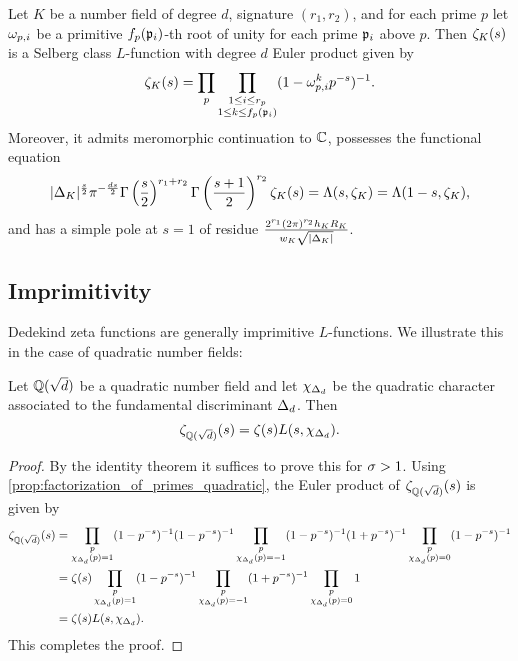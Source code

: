       \begin{theorem}\label{thm:Dedekind_Selberg}
        Let $K$ be a number field of degree $d$, signature $(r_{1},r_{2})$, and for each prime $p$ let $\omega_{p,i}$ be a primitive $f_{p}(\mathfrak{p}_{i})$-th root of unity for each prime $\mathfrak{p}_{i}$ above $p$. Then $\zeta_{K}(s)$ is a Selberg class $L$-function with degree $d$ Euler product given by
        \[
          \zeta_{K}(s) = \prod_{p}\prod_{\substack{1 \le i \le r_{p} \\ 1 \le k \le f_{p}(\mathfrak{p}_{i})}}(1-\omega_{p,i}^{k}p^{-s})^{-1}.
        \]
        Moreover, it admits meromorphic continuation to $\mathbb{C}$, possesses the functional equation
        \[
          |\Delta_{K}|^{\frac{s}{2}}\pi^{-\frac{ds}{2}}\Gamma\left(\frac{s}{2}\right)^{r_{1}+r_{2}}\Gamma\left(\frac{s+1}{2}\right)^{r_{2}}\zeta_{K}(s) = \Lambda(s,\zeta_{K}) = \Lambda(1-s,\zeta_{K}),
        \]
        and has a simple pole at $s = 1$ of residue $\frac{2^{r_{1}}(2\pi)^{r_{2}}h_{K}R_{K}}{w_{K}\sqrt{|\Delta_{K}|}}$.
      \end{theorem}
    \subsection*{Imprimitivity}
      Dedekind zeta functions are generally imprimitive $L$-functions. We illustrate this in the case of quadratic number fields:

      \begin{theorem}\label{thm:factorization_of_Dedekind_of_quadratic_number_field}
        Let $\mathbb{Q}(\sqrt{d})$ be a quadratic number field and let $\chi_{\Delta_{d}}$ be the quadratic character associated to the fundamental discriminant $\Delta_{d}$. Then
        \[
          \zeta_{\mathbb{Q}(\sqrt{d})}(s) = \zeta(s)L(s,\chi_{\Delta_{d}}).
        \]
      \end{theorem}
      \begin{proof}
        By the identity theorem it suffices to prove this for $\sigma > 1$. Using \cref{prop:factorization_of_primes_quadratic}, the Euler product of $\zeta_{\mathbb{Q}(\sqrt{d})}(s)$ is given by
        \begin{align*}
          \zeta_{\mathbb{Q}(\sqrt{d})}(s) &= \prod_{\substack{p \\ \chi_{\Delta_{d}}(p) = 1}}(1-p^{-s})^{-1}(1-p^{-s})^{-1}\prod_{\substack{p \\ \chi_{\Delta_{d}}(p) = -1}}(1-p^{-s})^{-1}(1+p^{-s})^{-1}\prod_{\substack{p \\ \chi_{\Delta_{d}}(p) = 0}}(1-p^{-s})^{-1} \\
          &= \zeta(s)\prod_{\substack{p \\ \chi_{\Delta_{d}}(p) = 1}}(1-p^{-s})^{-1}\prod_{\substack{p \\ \chi_{\Delta_{d}}(p) = -1}}(1+p^{-s})^{-1}\prod_{\substack{p \\ \chi_{\Delta_{d}}(p) = 0}}1 \\
          &= \zeta(s)L(s,\chi_{\Delta_{d}}).
        \end{align*}
        This completes the proof.
      \end{proof}

